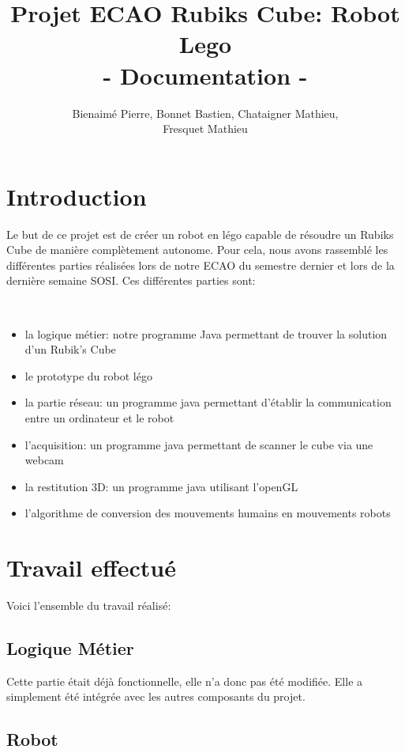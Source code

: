 \documentclass[a4paper,12pt]{article}
\title{Projet ECAO Rubiks Cube: Robot Lego\\ - Documentation -}
\author{Bienaimé Pierre, Bonnet Bastien, Chataigner Mathieu,\\ Fresquet Mathieu}
\begin{document}
\maketitle

\newpage

\tableofcontents
\newpage
\section{Introduction}


Le but de ce projet est de créer un robot en légo capable de résoudre un Rubiks Cube de manière complètement autonome. Pour cela, nous avons rassemblé les différentes parties réalisées lors de notre ECAO du semestre dernier et lors de la dernière semaine SOSI.
Ces différentes parties sont:

~

\begin{itemize}
 \item la logique métier: notre programme Java permettant de trouver la solution d'un Rubik's Cube
 \item le prototype du robot légo
 \item la partie réseau: un programme java permettant d'établir la communication entre un ordinateur et le robot
 \item l'acquisition: un programme java permettant de scanner le cube via une webcam
 \item la restitution 3D: un programme java utilisant l'openGL
 \item l'algorithme de conversion des mouvements humains en mouvements robots
\end{itemize}


\section{Travail effectué}

Voici l'ensemble du travail réalisé:


\subsection{Logique Métier}

 Cette partie était déjà fonctionnelle, elle n'a donc pas été modifiée. Elle a simplement été intégrée avec les autres composants du projet. 

\subsection{Robot} 
\end{document}
